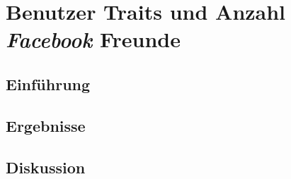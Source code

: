 \section{Benutzer Traits und Anzahl \textit{Facebook} Freunde}\label{sub.traits}

\subsection{Einführung}\label{subsec.traitsEinführung}

\subsection{Ergebnisse}\label{subsec.traitsErgebnisse}

\subsection{Diskussion}\label{subsec.traitsDiskussion}

